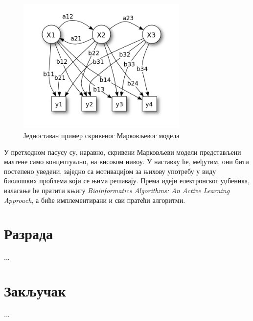 \documentclass[12pt,oneside]{memoir}
\begin{document}
\begin{figure}[!ht]
  \centering
  \includegraphics[width=0.75\textwidth]{hmm.png}
  \caption{Једноставан пример скривеног Марковљевог модела\cite{hmm}}
  \label{fig:hmm}
\end{figure}

У претходном пасусу су, наравно, скривени Марковљеви модели представљени малтене само концептуално, на високом нивоу. У наставку ће, међутим, они бити постепено уведени, заједно са мотивацијом за њихову употребу у виду биолошких проблема који се њима решавају. Према идеји електронског уџбеника, излагање ће пратити књигу \textit{Bioinformatics Algorithms: An Active Learning Approach}, а биће имплементирани и сви пратећи алгоритми.

\chapter{Разрада}
...

\chapter{Закључак}
...

\literatura
\end{document}
